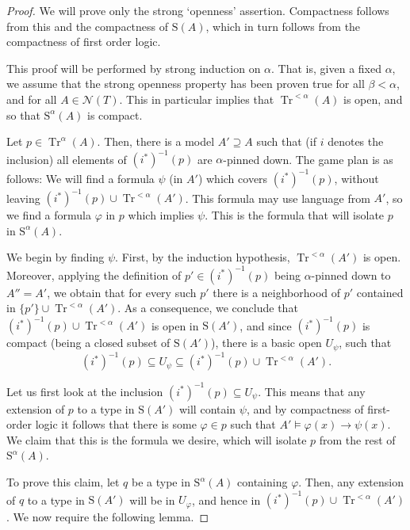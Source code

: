 \documentclass{article}
\theoremstyle{nonumberplain}
\newtheorem{proof}{Proof}
\newcommand{\calN}{\mathcal{N}}
\newcommand{\Stone}{\mathrm{S}}
\DeclareMathOperator{\Tr}{Tr}
\begin{document}
\begin{proof}
We will prove only the strong `openness' assertion. Compactness follows from this and the compactness of $\Stone(A)$, which in turn follows from the compactness of first order logic.

This proof will be performed by strong induction on $\alpha$. That is, given a fixed $\alpha$, we assume that the strong openness property has been proven true for all $\beta < \alpha$, and for all $A \in \calN(T)$. This in particular implies that $\Tr^{<\alpha}(A)$ is open, and so that $\Stone^\alpha(A)$ is compact.

Let $p \in \Tr^\alpha(A)$. Then, there is a model $A' \supseteq A$ such that (if $i$ denotes the inclusion) all elements of $(i^*)^{-1}(p)$ are $\alpha$-pinned down. The game plan is as follows: We will find a formula $\psi$ (in $A'$) which covers $(i^*)^{-1}(p)$, without leaving $(i^*)^{-1}(p) \cup \Tr^{<\alpha}(A')$. This formula may use language from $A'$, so we find a formula $\varphi$ in $p$ which implies $\psi$. This is the formula that will isolate $p$ in $\Stone^\alpha(A)$.

We begin by finding $\psi$. First, by the induction hypothesis, $\Tr^{<\alpha}(A')$ is open. Moreover, applying the definition of $p' \in (i^*)^{-1}(p)$ being $\alpha$-pinned down to $A'' = A'$, we obtain that for every such $p'$ there is a neighborhood of $p'$ contained in $\{p'\} \cup \Tr^{<\alpha}(A')$. As a consequence, we conclude that $(i^*)^{-1}(p) \cup \Tr^{<\alpha}(A')$ is open in $\Stone(A')$, and since $(i^*)^{-1}(p)$ is compact (being a closed subset of $\Stone(A')$), there is a basic open $U_\psi$, such that
\begin{equation}
(i^*)^{-1}(p) \subseteq U_\psi \subseteq (i^*)^{-1}(p) \cup \Tr^{<\alpha}(A').
\end{equation}

Let us first look at the inclusion $(i^*)^{-1}(p) \subseteq U_\psi$. This means that any extension of $p$ to a type in $\Stone(A')$ will contain $\psi$, and by compactness of first-order logic it follows that there is some $\varphi \in p$ such that $A' \vDash \varphi(x) \rightarrow \psi(x)$. We claim that this is the formula we desire, which will isolate $p$ from the rest of $\Stone^\alpha(A)$.

To prove this claim, let $q$ be a type in $\Stone^\alpha(A)$ containing $\varphi$. Then, any extension of $q$ to a type in $\Stone(A')$ will be in $U_\varphi$, and hence in $(i^*)^{-1}(p) \cup \Tr^{<\alpha}(A')$. We now require the following lemma.


\end{proof}
\end{document}
